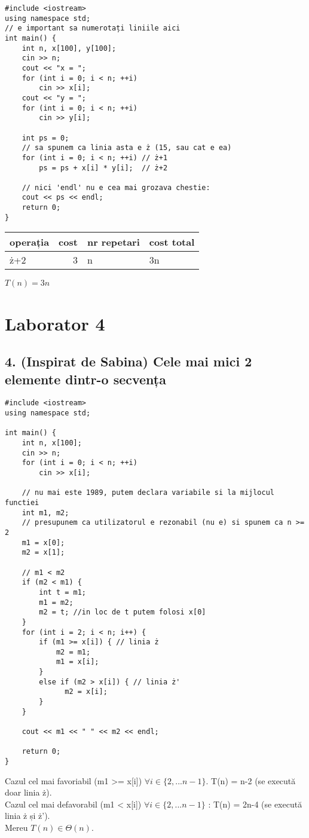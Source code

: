 \documentclass[11pt]{article}
\begin{document}
\begin{verbatim}
#include <iostream>
using namespace std;
// e important sa numerotați liniile aici
int main() {
    int n, x[100], y[100];
    cin >> n;
    cout << "x = ";
    for (int i = 0; i < n; ++i)
        cin >> x[i];
    cout << "y = ";
    for (int i = 0; i < n; ++i)
        cin >> y[i];

    int ps = 0;
    // sa spunem ca linia asta e ż (15, sau cat e ea)
    for (int i = 0; i < n; ++i) // ż+1
        ps = ps + x[i] * y[i];  // ż+2

    // nici 'endl' nu e cea mai grozava chestie:
    cout << ps << endl;
    return 0;
}
\end{verbatim}
\begin{center}
\begin{tabular}{lrll}
operația & cost & nr repetari & cost total\\
\hline
ż+2 & 3 & n & 3n\\
\end{tabular}
\end{center}

\(T(n) = 3n\)

\pagebreak
\section*{Laborator 4}
\label{sec:orga192196}
\subsection*{4. (Inspirat de Sabina) Cele mai mici 2 elemente dintr-o secvența}
\label{sec:org94a6ba9}
\begin{verbatim}
#include <iostream>
using namespace std;

int main() {
    int n, x[100];
    cin >> n;
    for (int i = 0; i < n; ++i)
        cin >> x[i];

    // nu mai este 1989, putem declara variabile si la mijlocul functiei
    int m1, m2;
    // presupunem ca utilizatorul e rezonabil (nu e) si spunem ca n >= 2
    m1 = x[0];
    m2 = x[1];

    // m1 < m2
    if (m2 < m1) {
        int t = m1;
        m1 = m2;
        m2 = t; //in loc de t putem folosi x[0]
    }
    for (int i = 2; i < n; i++) {
        if (m1 >= x[i]) { // linia ż
            m2 = m1;
            m1 = x[i];
        }
        else if (m2 > x[i]) { // linia ż'
              m2 = x[i];
        }
    }

    cout << m1 << " " << m2 << endl;

    return 0;
}
\end{verbatim}
\noindent
Cazul cel mai favoriabil (m1 >= x[i]) \(\forall i \in \{2, ...n-1\}\). T(n) = n-2 (se execută doar linia ż). \\
Cazul cel mai defavorabil (m1 < x[i]) \(\forall i \in \{2, ...n-1\}\) : T(n) = 2n-4 (se execută linia ż și ż'). \\
Mereu \(T(n) \in \Theta(n)\).
\end{document}
